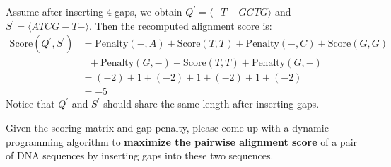 Assume after inserting $4$ gaps, we obtain $Q^\prime=\langle -T-GGTG\rangle$ and $S^\prime=\langle ATCG-T-\rangle$. Then the recomputed alignment score is:
\[
	\begin{aligned}
		\text{Score}(Q^\prime, S^\prime) & = \text{Penalty}(-, A) +\text{Score}(T, T)+\text{Penalty}(-, C) + \text{Score}(G, G) \\
		                                 & \ \ \  +\text{Penalty}(G, -)+\text{Score}(T, T)+ \text{Penalty}(G, -)               \\
		                                 & = (-2)+1+(-2)+1+(-2)+1+(-2)                                                          \\
		                                 & = -5
	\end{aligned}
\]
Notice that $Q^\prime$ and $S^\prime$ should share the same length after inserting gaps.


Given the scoring matrix and gap penalty, please come up with a dynamic programming algorithm to \textbf{maximize the pairwise alignment score} of a pair of DNA sequences by inserting gaps into these two sequences.


\newpage
{}

